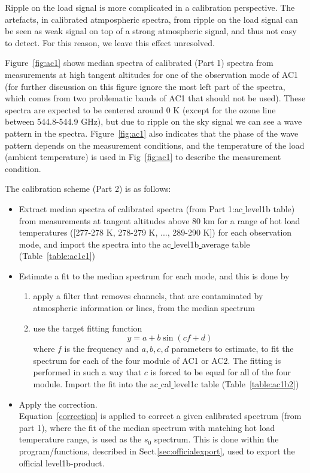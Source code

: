 \documentclass[12pt]{article}
\begin{document}
Ripple on the load signal is more complicated in 
a calibration perspective. The artefacts, in calibrated
atmpospheric spectra, from ripple on the
load signal can be seen as weak signal on top of a strong
atmospheric signal, and thus not easy to detect.
For this reason, we leave this effect unresolved.

Figure~\ref{fig:ac1} shows median spectra of calibrated (Part 1) spectra
from measurements at high tangent altitudes for one of the
observation mode of AC1 (for further discussion on this figure
ignore the most left part of the spectra, which comes from two 
problematic bands of AC1 that should not be used). 
These spectra are expected to be 
centered around 0 K (except for the ozone line between 544.8-544.9 GHz), 
but due to ripple on the sky signal we can see a wave pattern in the spectra.
Figure~\ref{fig:ac1} also indicates that the phase of the wave pattern
depends on the measurement conditions, and the temperature of
the load (ambient temperature) is used in Fig~\ref{fig:ac1}
to describe the measurement condition.


The calibration scheme (Part 2) is as follows:
\begin{itemize}
\item Extract median spectra of calibrated spectra 
(from Part 1:ac\underline{ }level1b table) 
from measurements at tangent altitudes above 80 km for a range of hot load 
temperatures ([277-278 K, 278-279 K, ..., 289-290 K]) 
for each observation mode, and import the spectra
into the ac\underline{ }level1b\underline{ }average table
(Table~\ref{table:ac1c1})
\item Estimate a fit to the median spectrum for each mode, and this is done
by
\begin{enumerate}
\item apply a filter that removes channels, that are contaminated by 
atmospheric information or lines, from the median spectrum 
\item use the target fitting function  
\begin{equation}
y=a+ b\sin(cf+d)
\end{equation}
where \(f\) is the frequency and \(a,b,c,d\) parameters to estimate,
to fit the spectrum for each of the four module of AC1 or AC2.
The fitting is performed in such a way that \(c\) is forced 
to be equal for all of the four module. 
Import the fit into the ac\underline{ }cal\underline{ }level1c
table (Table~\ref{table:ac1b2})
\end{enumerate}
\item Apply the correction.\\
Equation~\ref{correction} is applied to correct a given calibrated 
spectrum (from part 1), where the fit of the median spectrum
with matching hot load temperature range, is used as the \(s_{0}\)
spectrum. 
This is done within the program/functions, described in
Sect.\ref{sec:officialexport}, used to export the official
level1b-product.  
\end{itemize}
\end{document}
